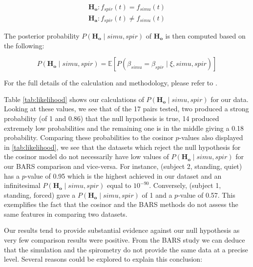\begin{equation}
\begin{split}
\mathbf{H_o} : f_{spir}(t) = f_{simu}(t)
\\
\mathbf{H_a} : f_{spir}(t) \neq f_{simu}(t)
\end{split}
\end{equation}

The posterior probability $P(\mathbf{H_o} \mid simu,spir)$ of $\mathbf{H_o}$ is then computed based on the following:

\begin{equation}
P(\mathbf{H_o} \mid simu,spir) = \mathbb{E} \left[ P( \beta_{simu} = \beta_{spir} \mid \xi , simu, spir) \right]
\end{equation}

For the full details of the calculation and methodology, please refer to \cite{fogarty2011slp}.

Table \ref{tab:likelihood} shows our calculations of $P(\mathbf{H_o} \mid simu,spir)$ for our data. Looking at these values, we see that of the 17 pairs tested, two produced a strong probability (of 1 and 0.86) that the null hypothesis is true, 14 produced extremely low probabilities and the remaining one is in the middle giving a 0.18 probability. 
Comparing these probabilities to the cosinor $p$-values also displayed in \ref{tab:likelihood}, we see that the datasets which reject the null hypothesis for the cosinor model do not necessarily have low values of $P(\mathbf{H_o} \mid simu,spir)$ for our BARS comparison and vice-versa. For instance, (subject 2, standing, quiet) has a $p$-value of 0.95 which is the highest achieved in our dataset and an infinitesimal $P(\mathbf{H_o} \mid simu,spir)$ equal to $10^{-90}$. Conversely, (subject 1, standing, forced) gave a $P(\mathbf{H_o} \mid simu,spir)$ of 1 and a $p$-value of 0.57. This exemplifies the fact that the cosinor and the BARS methods do not assess the same features in comparing two datasets.

Our results tend to provide substantial evidence against our null hypothesis as very few comparison results were positive. From the BARS study we can deduce that the simulation and the spirometry do not provide the same data at a precise level. Several reasons could be explored to explain this conclusion:


